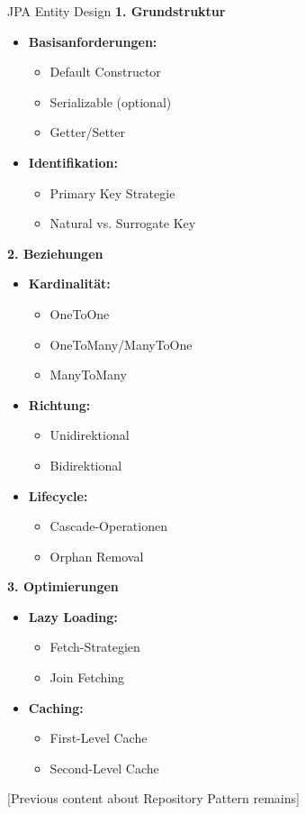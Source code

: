 \begin{KR}{JPA Entity Design}
\textbf{1. Grundstruktur}
\begin{itemize}
    \item \textbf{Basisanforderungen:}
    \begin{itemize}
        \item Default Constructor
        \item Serializable (optional)
        \item Getter/Setter
    \end{itemize}
    \item \textbf{Identifikation:}
    \begin{itemize}
        \item Primary Key Strategie
        \item Natural vs. Surrogate Key
    \end{itemize}
\end{itemize}

\textbf{2. Beziehungen}
\begin{itemize}
    \item \textbf{Kardinalität:}
    \begin{itemize}
        \item OneToOne
        \item OneToMany/ManyToOne
        \item ManyToMany
    \end{itemize}
    \item \textbf{Richtung:}
    \begin{itemize}
        \item Unidirektional
        \item Bidirektional
    \end{itemize}
    \item \textbf{Lifecycle:}
    \begin{itemize}
        \item Cascade-Operationen
        \item Orphan Removal
    \end{itemize}
\end{itemize}

\textbf{3. Optimierungen}
\begin{itemize}
    \item \textbf{Lazy Loading:}
    \begin{itemize}
        \item Fetch-Strategien
        \item Join Fetching
    \end{itemize}
    \item \textbf{Caching:}
    \begin{itemize}
        \item First-Level Cache
        \item Second-Level Cache
    \end{itemize}
\end{itemize}
\end{KR}

[Previous content about Repository Pattern remains]